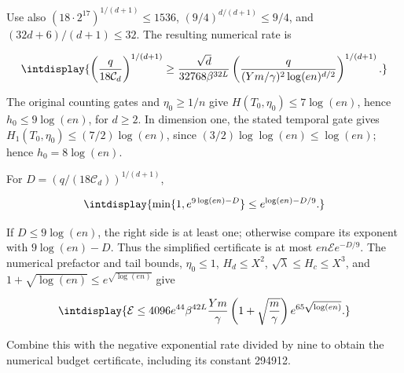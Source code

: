 
Use also \((18\cdot2^{17})^{1/(d+1)}\le1536\), \((9/4)^{d/(d+1)}\le9/4\), and \((32d+6)/(d+1)\le32\). The resulting numerical rate is


\begingroup\renewcommand{\theHequation}{intdisplay.640}
\begin{equation}
\intdisplay{
\left(\frac q{18\mathcal C_d}\right)^{1/(d+1)}
\ge\frac{\sqrt d}{32768\beta^{32L}}
   \left(\frac q{(Ym/\gamma)^2\log(en)^{d/2}}\right)^{1/(d+1)}.
}
\label{int:eq-0272-harmonic-explicit-negative-exponential-rate}
\end{equation}
\endgroup


The original counting gates and \(\eta_0\ge1/n\) give \(H(T_0,\allowbreak \eta_0)\le7\log(en)\), hence \(h_0\le9\log(en)\), for \(d\ge2\). In dimension one, the stated temporal gate gives \(H_1(T_0,\allowbreak \eta_0)\le(7/2)\log(en)\), since \((3/2)\log\log(en)\le\log(en)\); hence \(h_0=8\log(en)\).



For \(D=(q/(18\mathcal C_d))^{1/(d+1)}\),


\begingroup\renewcommand{\theHequation}{intdisplay.641}
\begin{equation*}
\intdisplay{
\min\{1,e^{9\log(en)-D}\}\le e^{\log(en)-D/9}.
}
\end{equation*}
\endgroup


If \(D\le9\log(en)\), the right side is at least one; otherwise compare its exponent with \(9\log(en)-D\). Thus the simplified certificate is at most \(en\mathcal E e^{-D/9}\). The numerical prefactor and tail bounds, \(\eta_0\le1\), \(H_d\le X^2\), \(\sqrt\lambda\le H_c\le X^3\), and \(1+\sqrt{\log(en)}\le e^{\sqrt{\log(en)}}\) give


\begingroup\renewcommand{\theHequation}{intdisplay.642}
\begin{equation*}
\intdisplay{
\mathcal E\le4096e^{44}\beta^{42L}\frac{Ym}{\gamma}
 \left(1+\sqrt{\frac m\gamma}\right)e^{65\sqrt{\log(en)}}.
}
\end{equation*}
\endgroup


Combine this with the negative exponential rate divided by nine to obtain the numerical budget certificate, including its constant 294912.


